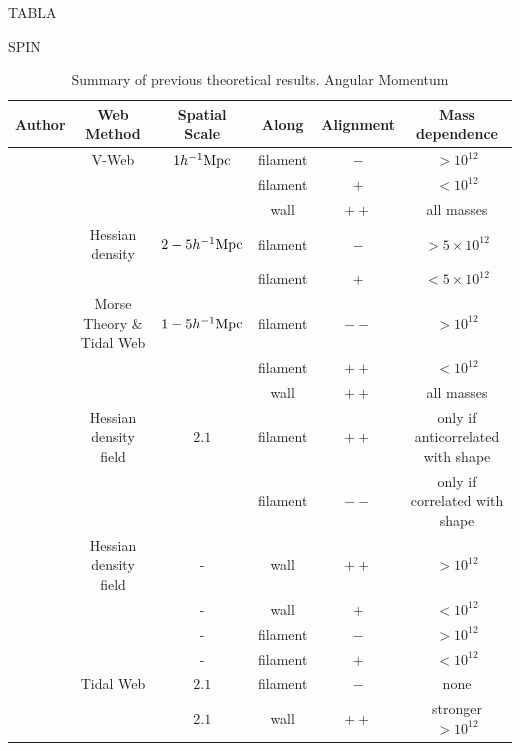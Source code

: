 \documentclass[usenatbib]{mn2e}
\newcommand{\hMpc}{{\ifmmode{h^{-1}{\rm Mpc}}\else{$h^{-1}$Mpc }\fi}}
\newcommand{\hMsun}{{\ifmmode{h^{-1}{\rm {M_{\odot}}}}\else{$h^{-1}{\rm{M_{\odot}}}$}\fi}}
\begin{document}
TABLA
\begin{table}
SPIN
\begin{tabular}{cccccc}\hline\hline
Author & Web Method & Spatial Scale & Along &
Alignment & Mass dependence\\\hline

\cite{Libeskind2013} & V-Web & $1 \hMpc$ & 
filament &$-$ & $>10^{12}$\hMsun\\

&   & & 
filament &$+$ & $<10^{12}$\hMsun\\

&   & & 
wall & $++$ & all masses\\

\cite{Trowland2013} & Hessian density & $2-5\hMpc$ & 
filament & $-$ & $> 5\times 10^{12}$\hMsun\\
&   & & 
filament & $+$ & $< 5\times 10^{12}$\hMsun\\

\cite{Codis2012} & Morse Theory \& Tidal Web & $1-5\hMpc$ & 
filament & $--$ & $>10^{12}$\hMsun \\ 

&   & & 
filament & $++$ & $<10^{12}$\hMsun \\ 

& & & 
wall & $++$ & all masses\\

\cite{Zhang2009}  & Hessian density field &  $2.1$\hMpc & 
filament & $++$ & only if anticorrelated with shape\\

& &  & 
filament & $--$ & only if correlated with shape\\

\cite{AragonCalvo2007} & Hessian density field & - &
wall & $++$ & $>10^{12}$\hMsun\\


& & - &
wall & $+$ & $<10^{12}$\hMsun\\

& & - &
filament& $-$ & $>10^{12}$\hMsun\\


& & - &
filament& $+$ & $<10^{12}$\hMsun\\



\cite{Hahn2007} & Tidal Web & $2.1$\hMpc & filament & $-$& none\\


& &  $2.1$\hMpc &
wall & $++$ & stronger $>10^{12}$\hMsun\\\hline \hline



\end{tabular}\\
\caption{Summary of previous theoretical results.
Angular Momentum}
\end{table}
\end{document}

